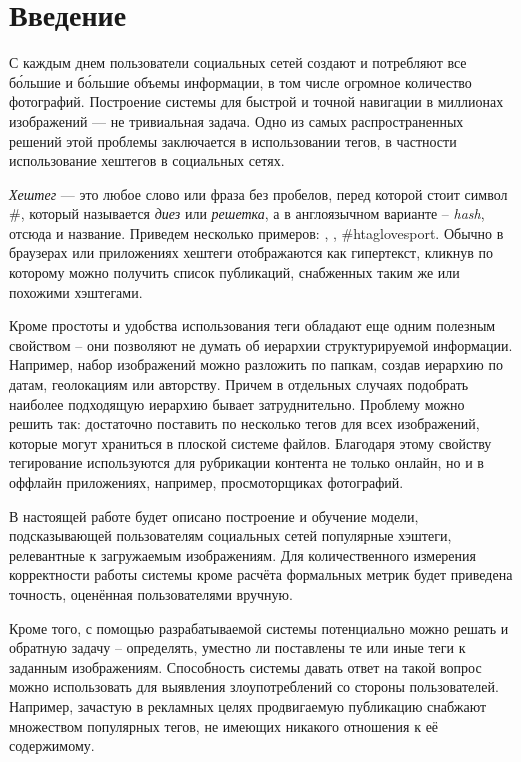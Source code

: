 \section*{Введение}

\indent
\indent
С каждым днем пользователи социальных сетей создают и потребляют все б\'{о}льшие
и б\'{о}льшие объемы информации, в том числе огромное количество фотографий.
Построение системы для быстрой и точной навигации в миллионах изображений
 --- не тривиальная задача. Одно из самых распространенных решений этой
 проблемы заключается в использовании тегов, в частности
 использование хештегов в социальных сетях.


\indent
\textit{Хештег} --- это любое слово или фраза без пробелов, перед которой стоит 
символ \#, который называется \textit{диез} или \textit{решетка}, а в англоязычном 
варианте -- \textit{hash}, отсюда и название. Приведем несколько примеров:
, , \#htag{lovesport}. Обычно в браузерах или 
приложениях хештеги отображаются как гипертекст, кликнув по которому можно 
получить список публикаций, снабженных таким же или похожими хэштегами.


\indent
Кроме простоты и удобства использования теги обладают еще одним полезным свойством 
-- они позволяют не думать об  иерархии структурируемой информации. 
Например, набор изображений можно разложить
по папкам, создав иерархию по датам, геолокациям или авторству. Причем в отдельных
случаях подобрать наиболее подходящую иерархию бывает затруднительно. Проблему
можно решить так: достаточно поставить по несколько тегов для всех изображений,
которые могут храниться в плоской системе файлов.
Благодаря этому свойству тегирование используются  для рубрикации контента 
не только онлайн, но и в оффлайн приложениях, например, 
просмоторщиках фотографий. 


\indent 
В настоящей работе будет описано построение и обучение модели, подсказывающей 
пользователям социальных сетей популярные хэштеги, релевантные к загружаемым
изображениям. Для количественного измерения корректности работы системы 
кроме расчёта формальных метрик будет приведена точность,
оценённая пользователями вручную.


\indent
Кроме того, с помощью разрабатываемой системы потенциально можно решать и 
обратную задачу -- определять,
уместно ли поставлены те или иные теги к заданным изображениям. 
Способность системы давать ответ на такой вопрос можно использовать для 
выявления злоупотреблений со стороны пользователей. Например, зачастую
 в рекламных целях продвигаемую публикацию снабжают множеством популярных 
тегов, не имеющих никакого отношения к её содержимому.
 
 